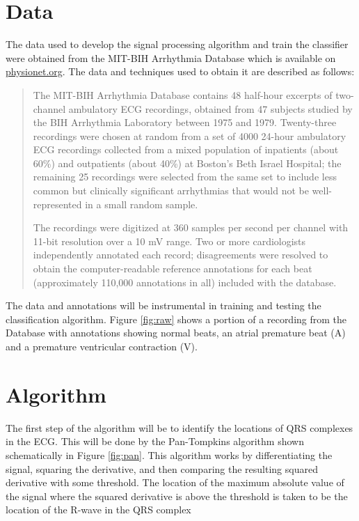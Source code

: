 \documentclass[12pt,letter]{article}
\begin{document}
\section{Data}
The data used to develop the signal processing algorithm and train the
classifier were obtained from the MIT-BIH Arrhythmia Database which is available
on \url{physionet.org}.  The data and techniques used to obtain it are described
as follows: 
\begin{quotation}
     The MIT-BIH Arrhythmia Database contains 48 half-hour excerpts of
     two-channel ambulatory ECG recordings, obtained from 47 subjects studied by
     the BIH Arrhythmia Laboratory between 1975 and 1979. Twenty-three
     recordings were chosen at random from a set of 4000 24-hour ambulatory ECG
     recordings collected from a mixed population of inpatients (about 60\%) and
     outpatients (about 40\%) at Boston's Beth Israel Hospital; the remaining 25
     recordings were selected from the same set to include less common but
     clinically significant arrhythmias that would not be well-represented in a
     small random sample.

     The recordings were digitized at 360 samples per second per channel with
     11-bit resolution over a 10 mV range. Two or more cardiologists
     independently annotated each record; disagreements were resolved to obtain
     the computer-readable reference annotations for each beat (approximately
     110,000 annotations in all) included with the database.
\end{quotation}

The data and annotations will be instrumental in training and testing the
classification algorithm.  Figure \ref{fig:raw} shows a portion of a recording
from the Database with annotations showing normal beats, an atrial premature
beat (A) and a premature ventricular contraction (V).  

\section{Algorithm}
The first step of the algorithm will be to identify the locations of QRS
complexes in the ECG.  This will be done by the Pan-Tompkins algorithm shown
schematically in Figure \ref{fig:pan}.  This algorithm works by differentiating
the signal, squaring the derivative, and then comparing the resulting squared
derivative with some threshold.  The location of the maximum absolute value of
the signal where the squared derivative is above the threshold is taken to be
the location of the R-wave in the QRS complex \cite{pan-tompkins85}
\end{document}

